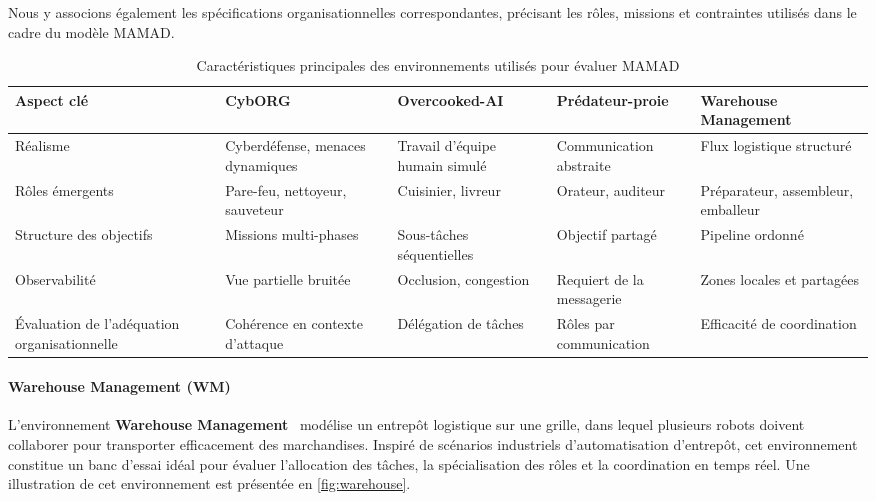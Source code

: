 \documentclass[pdflatex,sn-mathphys-num]{sn-jnl}%
\theoremstyle{thmstyleone}%
\theoremstyle{thmstyletwo}%
\theoremstyle{thmstylethree}%
\begin{document}
Nous y associons également les spécifications organisationnelles correspondantes, précisant les rôles, missions et contraintes utilisés dans le cadre du modèle MAMAD.

\vspace{0.5em}
\begin{table}[h!]
    \centering
    \begin{footnotesize}
        \renewcommand{\arraystretch}{1.3}
        \begin{tabular}{p{2.5cm}p{2.2cm}p{2.2cm}p{2.2cm}p{2.2cm}}
            \hline
            \textbf{Aspect clé}            & \textbf{CybORG}               & \textbf{Overcooked-AI} & \textbf{Prédateur-proie} & \textbf{Warehouse Management} \\ \hline
            Réalisme                       & Cyberdéfense, menaces dynamiques & Travail d'équipe humain simulé & Communication abstraite     & Flux logistique structuré \\ \hline
            Rôles émergents                & Pare-feu, nettoyeur, sauveteur & Cuisinier, livreur     & Orateur, auditeur          & Préparateur, assembleur, emballeur \\ \hline
            Structure des objectifs        & Missions multi-phases         & Sous-tâches séquentielles & Objectif partagé         & Pipeline ordonné \\ \hline
            Observabilité                  & Vue partielle bruitée         & Occlusion, congestion   & Requiert de la messagerie & Zones locales et partagées \\ \hline
            Évaluation de l'adéquation organisationnelle & Cohérence en contexte d'attaque & Délégation de tâches   & Rôles par communication   & Efficacité de coordination \\ \hline
        \end{tabular}
        \caption{Caractéristiques principales des environnements utilisés pour évaluer MAMAD}
        \label{tab:mamad_env_characteristics}
    \end{footnotesize}
\end{table}


\paragraph{Warehouse Management (WM)}

L'environnement \textbf{Warehouse Management}~\cite{warehouse_management} modélise un entrepôt logistique sur une grille, dans lequel plusieurs robots doivent collaborer pour transporter efficacement des marchandises. Inspiré de scénarios industriels d'automatisation d'entrepôt, cet environnement constitue un banc d'essai idéal pour évaluer l'allocation des tâches, la spécialisation des rôles et la coordination en temps réel. Une illustration de cet environnement est présentée en \autoref{fig:warehouse}.
\end{document}
